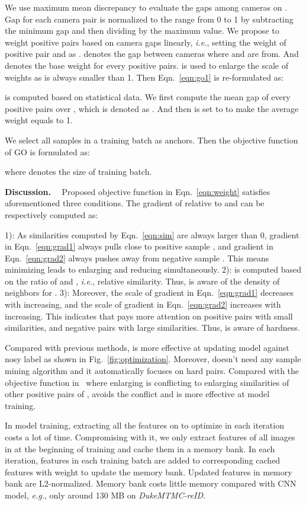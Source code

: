 \documentclass[sigconf]{acmart}
\begin{document}
We use maximum mean discrepancy to evaluate the gaps among cameras on . Gap for each camera pair is normalized to the range from 0 to 1 by subtracting the minimum gap and then dividing by the maximum value. We propose to weight positive pairs based on camera gaps linearly, \textit{i.e.}, setting the weight of positive pair  and  as .  denotes the gap between cameras where  and  are from. And  denotes the base weight for every positive pairs.  is used to enlarge the scale of weights as  is always smaller than 1. Then Eqn.~\eqref{eqn:go1} is re-formulated as:

 is computed based on statistical data. We first compute the mean gap of every positive pairs over , which is denoted as . And then  is set to  to make the average weight equals to 1.

We select all samples in a training batch as anchors. Then the objective function of GO is formulated as:

where  denotes the size of training batch.

\textbf{Discussion.} \ \ 
Proposed objective function in Eqn.~\eqref{eqn:weight} satisfies aforementioned three conditions. The gradient of  relative to  and  can be respectively computed as:


1): As similarities computed by Eqn.~\eqref{eqn:sim} are always larger than 0, gradient in Eqn.~\eqref{eqn:grad1} always pulls  close to positive sample , and gradient in Eqn.~\eqref{eqn:grad2} always pushes  away from negative sample . This means minimizing  leads to enlarging  and reducing  simultaneously. 
2):  is computed based on the ratio of  and , \textit{i.e.}, relative similarity. Thus,  is aware of the density of neighbors for .
3): Moreover, the scale of gradient in Eqn.~\eqref{eqn:grad1} decreases with  increasing, and the scale of gradient in Eqn.~\eqref{eqn:grad2} increases with  increasing. This indicates that  pays more attention on positive pairs with small similarities, and negative pairs with large similarities. Thus,  is aware of hardness. 


Compared with previous methods,  is more effective at updating model against nosy label as shown in Fig.~\ref{fig:optimization}. Moreover,   doesn't need any sample mining algorithm and it automatically focuses on hard pairs. Compared with the objective function in~\cite{zhong2019invariance} where enlarging  is conflicting to enlarging similarities of other positive pairs of ,  avoids the conflict and is more effective at model training.

In model training, extracting all the features on  to optimize  in each iteration costs a lot of time. Compromising with it, we only extract features of all images in  at the beginning of training and cache them in a memory bank. In each iteration, features in each training batch are added to corresponding cached features with weight  to update the memory bank. Updated features in memory bank are L2-normalized. Memory bank costs little memory compared with CNN model, \textit{e.g.}, only around 130 MB on \textit{DukeMTMC-reID}.
\end{document}
